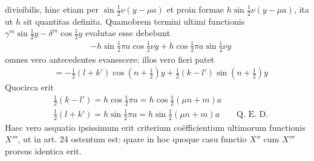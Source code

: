divisibilis, hinc etiam per $\sin\tfrac12\nu(y-\mu a)$ et proin formae $h\sin\tfrac12\nu(y-\mu a)$, ita ut $h$ sit quantitas definita. Quamobrem termini ultimi functionis $\gamma^m\sin\tfrac12y-\delta^m\cos\tfrac12y$ evolutae esse debebunt
\[
\begin{aligned}
&-h\sin\tfrac12\pi a\cos\tfrac12\nu y+h\cos\tfrac12\pi a\sin\tfrac12\nu y
\end{aligned}
\]
omnes vero antecedentes evanescere: illos vero fieri patet
\[
\begin{aligned}
&=-\tfrac12(l+k')\cos(n+\tfrac12)y+\tfrac12(k-l')\sin(n+\tfrac12)y
\end{aligned}
\]
Quocirca erit
\[
\begin{aligned}
&\tfrac12(k-l')=h\cos\tfrac12\pi a=h\cos\tfrac12(\mu n+m)a\\[5pt]
&\tfrac12(l+k')=h\sin\tfrac12\pi a=h\sin\tfrac12(\mu n+m)a\qquad\text{Q.~E.~D.}
\end{aligned}
\]
Haec vero aequatio ipsissimum erit criterium coëfficientium ultimorum functionis
$X'''$, ut in art. 24 ostentum est: quare in hoc quoque casu functio $X''$ cum $X'''$
prorsus identica erit.

